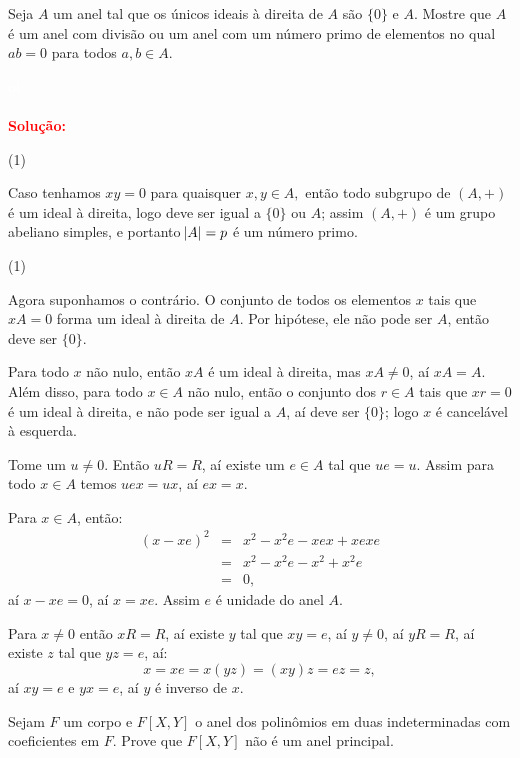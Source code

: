 \documentclass[11pt,a4paper]{article}
\newcounter{exercicio}[section]
\newcommand{\dividiritens}[1]{\begin{tasks}[counter-format={(tsk[a])},label-width=3.6ex, label-format = {\bfseries}, column-sep = {0pt}](1) #1 \end{tasks}}
\newcommand{\pers}[1]{\textcolor{Floresta}{$\negrito{(#1)} $}}
\newcommand{\solucao}[1]{
\textbf{\textcolor{white}{oi}\\ \\ \textcolor{red}{Solução:}} #1}
\begin{document}
  Seja $A$ um anel tal que os únicos ideais à direita de $A$ são $\{0\}$ e $A.$ Mostre que $A$ é um anel com divisão ou um anel com um número primo de elementos no qual $ab = 0$ para todos $a, b \in A.$
\solucao{
\dividiritens{
\task[\pers{a}]
}
Caso tenhamos $xy = 0$ para quaisquer $x,y \in A,$ então todo subgrupo de $(A,+)$ é um ideal à direita, logo deve ser igual a $\{0\}$ ou $A$; assim $(A, +)$ é um grupo abeliano simples, e portanto $\abs{A} = p$ é um número primo.

\dividiritens{
\task[\pers{b}]
}
Agora suponhamos o contrário. O conjunto de todos os elementos $x$ tais que $xA=0$ forma um ideal à direita de $A$. Por hipótese, ele não pode ser $A$, então deve ser $\{0\}$.

\medskip
\noindent
Para todo $x$ não nulo, então $xA$ é um ideal à direita, mas $xA\neq 0$, aí $xA=A$. Além disso, para todo $x\in A$ não nulo, então o conjunto dos $r\in A$ tais que $xr=0$ é um ideal à direita, e não pode ser igual a $A$, aí deve ser $\{0\}$; logo $x$ é cancelável à esquerda.

\medskip
\noindent
Tome um $u\neq 0$. Então $uR=R$, aí existe um $e\in A$ tal que $ue=u$. Assim para todo $x\in A$ temos $uex=ux$, aí $ex=x$.

\medskip
\noindent
Para $x\in A$, então:
\[
\begin{array}{rcl}
(x-xe)^2&=&x^2-x^2e-xex+xexe\\
&=&x^2-x^2e-x^2+x^2e\\
&=&0,
\end{array}
\]
aí $x-xe=0$, aí $x=xe$. Assim $e$ é unidade do anel $A$.

\medskip
\noindent
Para $x\neq 0$ então $xR=R$, aí existe $y$ tal que $xy=e$, aí $y\neq 0$, aí $yR=R$, aí existe $z$ tal que $yz=e$, aí:
\[
x=xe=x(yz)=(xy)z=ez=z,
\]
aí $xy=e$ e $yx=e$, aí $y$ é inverso de $x$.
}
 Sejam $F$ um corpo e $F[X,Y]$ o anel dos polinômios em duas indeterminadas com coeficientes em $F$.
Prove que $F[X, Y]$ não é um anel principal. 
\end{document}
